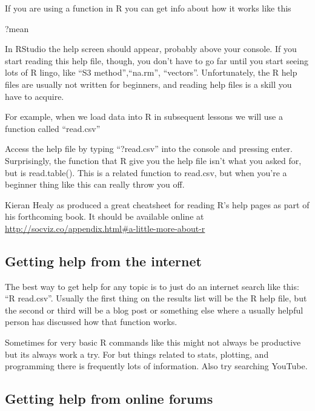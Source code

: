 \documentclass[]{book}
\newenvironment{Shaded}{\begin{snugshade}}{\end{snugshade}}
\newcommand{\NormalTok}[1]{#1}
\theoremstyle{definition}
\theoremstyle{definition}
\theoremstyle{definition}
\theoremstyle{remark}
\begin{document}
If you are using a function in R you can get info about how it works
like this

\begin{Shaded}
\begin{Highlighting}[]
\NormalTok{?mean}
\end{Highlighting}
\end{Shaded}

In RStudio the help screen should appear, probably above your console.
If you start reading this help file, though, you don't have to go far
until you start seeing lots of R lingo, like ``S3 method'',``na.rm'',
``vectors''. Unfortunately, the R help files are usually not written for
beginners, and reading help files is a skill you have to acquire.

For example, when we load data into R in subsequent lessons we will use
a function called ``read.csv''

Access the help file by typing ``?read.csv'' into the console and
pressing enter. Surprisingly, the function that R give you the help file
isn't what you asked for, but is read.table(). This is a related
function to read.csv, but when you're a beginner thing like this can
really throw you off.

Kieran Healy as produced a great cheatsheet for reading R's help pages
as part of his forthcoming book. It should be available online at
\url{http://socviz.co/appendix.html\#a-little-more-about-r}

\subsection{Getting help from the
internet}\label{getting-help-from-the-internet}

The best way to get help for any topic is to just do an internet search
like this: ``R read.csv''. Usually the first thing on the results list
will be the R help file, but the second or third will be a blog post or
something else where a usually helpful person has discussed how that
function works.

Sometimes for very basic R commands like this might not always be
productive but its always work a try. For but things related to stats,
plotting, and programming there is frequently lots of information. Also
try searching YouTube.

\subsection{Getting help from online
forums}\label{getting-help-from-online-forums}
\end{document}
